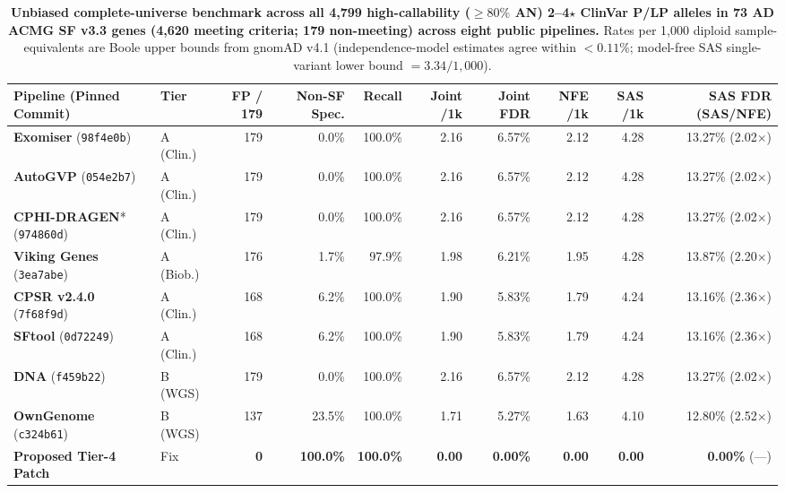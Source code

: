 \documentclass[11pt,letterpaper]{article}
\begin{document}
\begin{table}[!t]
\centering
\caption{\textbf{Unbiased complete-universe benchmark across all 4,799 high-callability ($\ge 80\%$ AN) 2--4$\star$ ClinVar P/LP alleles in 73 AD ACMG SF v3.3 genes (4,620 meeting criteria; 179 non-meeting) across eight public pipelines.} Rates per 1,000 diploid sample-equivalents are Boole upper bounds from gnomAD v4.1 (independence-model estimates agree within $<0.11\%$; model-free SAS single-variant lower bound $=3.34/1{,}000$).}
\label{tab:unbiased}
\footnotesize
\setlength{\tabcolsep}{2.6pt}
\begin{tabularx}{\textwidth}{Y C{1.05cm} r r r r r r r r}
\toprule
\textbf{Pipeline (Pinned Commit)} & \textbf{Tier} & \textbf{FP / 179} & \textbf{Non-SF Spec.} & \textbf{Recall} & \textbf{Joint /1k} & \textbf{Joint FDR} & \textbf{NFE /1k} & \textbf{SAS /1k} & \textbf{SAS FDR (SAS/NFE)} \\
\midrule
\textbf{Exomiser} (\texttt{98f4e0b}) & A (Clin.) & 179 & 0.0\% & 100.0\% & 2.16 & 6.57\% & 2.12 & 4.28 & 13.27\% (2.02$\times$) \\
\textbf{AutoGVP} (\texttt{054e2b7}) & A (Clin.) & 179 & 0.0\% & 100.0\% & 2.16 & 6.57\% & 2.12 & 4.28 & 13.27\% (2.02$\times$) \\
\textbf{CPHI-DRAGEN}* (\texttt{974860d}) & A (Clin.) & 179 & 0.0\% & 100.0\% & 2.16 & 6.57\% & 2.12 & 4.28 & 13.27\% (2.02$\times$) \\
\textbf{Viking Genes} (\texttt{3ea7abe}) & A (Biob.) & 176 & 1.7\% & 97.9\% & 1.98 & 6.21\% & 1.95 & 4.28 & 13.87\% (2.20$\times$) \\
\textbf{CPSR v2.4.0} (\texttt{7f68f9d}) & A (Clin.) & 168 & 6.2\% & 100.0\% & 1.90 & 5.83\% & 1.79 & 4.24 & 13.16\% (2.36$\times$) \\
\textbf{SFtool} (\texttt{0d72249}) & A (Clin.) & 168 & 6.2\% & 100.0\% & 1.90 & 5.83\% & 1.79 & 4.24 & 13.16\% (2.36$\times$) \\
\midrule
\textbf{DNA} (\texttt{f459b22}) & B (WGS) & 179 & 0.0\% & 100.0\% & 2.16 & 6.57\% & 2.12 & 4.28 & 13.27\% (2.02$\times$) \\
\textbf{OwnGenome} (\texttt{c324b61}) & B (WGS) & 137 & 23.5\% & 100.0\% & 1.71 & 5.27\% & 1.63 & 4.10 & 12.80\% (2.52$\times$) \\
\midrule
\textbf{Proposed Tier-4 Patch} & Fix & \textbf{0} & \textbf{100.0\%} & \textbf{100.0\%} & \textbf{0.00} & \textbf{0.00\%} & \textbf{0.00} & \textbf{0.00} & \textbf{0.00\%} (---) \\
\bottomrule
\end{tabularx}
\vspace{2pt}


\end{table}
\end{document}
